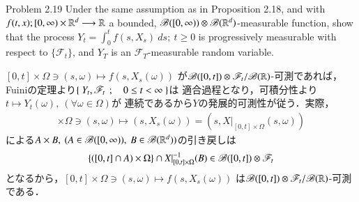 	\begin{itembox}[l]{Problem 2.19}
		Under the same assumption as in Proposition 2.18, and with 
		$f(t,x);[0,\infty) \times \mathbb{R}^d \longrightarrow \mathbb{R}$ a bounded,
		$\mathscr{B}([0,\infty)) \otimes \mathscr{B}(\mathbb{R}^d)$-measurable function,
		show that the process $Y_t = \int_0^t f(s,X_s)\ ds;\ t \geq 0$ is
		progressively measurable with respect to $\{\mathscr{F}_t\}$, 
		and  $Y_T$ is an $\mathscr{F}_T$-measurable random variable.
	\end{itembox}
	
	\begin{prf}
		$[0,t] \times \Omega \ni (s,\omega) \longmapsto f(s,X_s(\omega))$
		が$\mathscr{B}([0,t]) \otimes \mathscr{F}_t/\mathscr{B}(\mathbb{R})$-可測であれば，
		Fuiniの定理より$\left\{\ Y_t,\mathscr{F}_t\ \, ; \quad 0 \leq t < \infty\ \right\}$は
		適合過程となり，可積分性より$t \longmapsto Y_t(\omega),\ (\forall \omega \in \Omega)$が
		連続であるから$Y$の発展的可測性が従う．実際，
		\begin{align}
			[0,t] \times \Omega \ni (s,\omega)
			\longmapsto \left( s,X_s(\omega)\right) 
			= \left( s,X|_{[0,t] \times \Omega}(s,\omega) \right)
		\end{align}
		による$A \times B,\ (A \in \mathscr{B}([0,\infty)),\ B \in \mathscr{B}(\mathbb{R}^d))$の引き戻しは
		\begin{align}
			\left\{ ([0,t] \cap A) \times \Omega \right\} \cap
			X|_{[0,t] \times \Omega}^{-1}(B)
			\in \mathscr{B}([0,t]) \otimes \mathscr{F}_t
		\end{align}
		となるから，$[0,t] \times \Omega \ni (s,\omega) \longmapsto f(s,X_s(\omega))$
		は$\mathscr{B}([0,t]) \otimes \mathscr{F}_t/\mathscr{B}(\mathbb{R})$-可測である．
		\QED
	\end{prf}